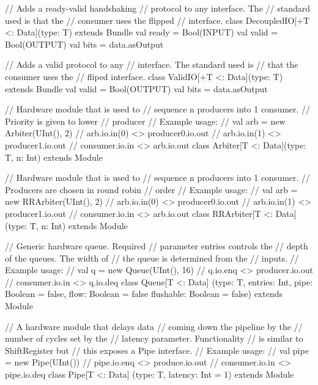 \documentclass[10pt,twocolumn]{article}
\begin{document}
\begin{scala}
// Adds a ready-valid handshaking
// protocol to any interface. The 
// standard used is that the
// consumer uses the flipped
// interface.
class DecoupledIO[+T <: Data](type: T) 
    extends Bundle {
  val ready = Bool(INPUT)
  val valid = Bool(OUTPUT)
  val bits  = data.asOutput
}

// Adds a valid protocol to any
// interface. The standard used is
// that the consumer uses the
// fliped interface.
class ValidIO[+T <: Data](type: T) 
    extends Bundle {
  val valid = Bool(OUTPUT)
  val bits = data.asOutput
}

// Hardware module that is used to 
// sequence n producers into 1 consumer. 
// Priority is given to lower
// producer
// Example usage:
//    val arb = new Arbiter(UInt(), 2)
//    arb.io.in(0) <> producer0.io.out
//    arb.io.in(1) <> producer1.io.out
//    consumer.io.in <> arb.io.out
class Arbiter[T <: Data](type: T, n: Int) 
  extends Module 

// Hardware module that is used to 
// sequence n producers into 1 consumer.
// Producers are chosen in round robin 
// order
// Example usage:
//    val arb = new RRArbiter(UInt(), 2)
//    arb.io.in(0) <> producer0.io.out
//    arb.io.in(1) <> producer1.io.out
//    consumer.io.in <> arb.io.out
class RRArbiter[T <: Data](type: T, n: Int) 
  extends Module 

// Generic hardware queue. Required
// parameter entries controls the
// depth of the queues. The width of
// the queue is determined from the 
// inputs.
// Example usage:
//    val q = new Queue(UInt(), 16)
//    q.io.enq <> producer.io.out
//    consumer.io.in <> q.io.deq
class Queue[T <: Data]
    (type: T, entries: Int, 
     pipe: Boolean = false,
     flow: Boolean = false
     flushable: Boolean = false)
    extends Module  

// A hardware module that delays data 
// coming down the pipeline by the 
// number of cycles set by the 
// latency parameter. Functionality
// is similar to ShiftRegister but
// this exposes a Pipe interface.
// Example usage:
//    val pipe = new Pipe(UInt())
//    pipe.io.enq <> produce.io.out
//    consumer.io.in <> pipe.io.deq
class Pipe[T <: Data]
    (type: T, latency: Int = 1) extends Module

\end{scala}

\end{document}

